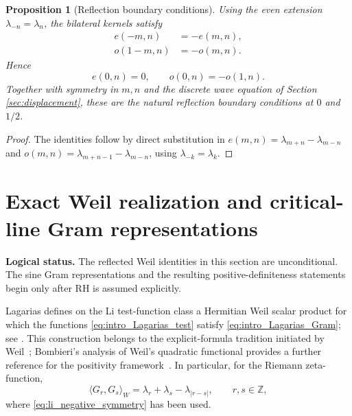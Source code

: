 \documentclass[preprint,12pt]{elsarticle}
\numberwithin{equation}{section}
\theoremstyle{plain}
\newtheorem{proposition}[theorem]{Proposition}
\theoremstyle{definition}
\theoremstyle{remark}
\newcommand{\RH}{\mathrm{RH}}
\begin{document}
\begin{proposition}[Reflection boundary conditions]
\label{prop:reflection_boundary_conditions}
Using the even extension $\lambda_{-n}=\lambda_n$, the bilateral kernels satisfy
\begin{align}
e(-m,n)&=-e(m,n),
\label{eq:E_reflection_oddness}\\
o(1-m,n)&=-o(m,n).
\label{eq:O_reflection_oddness}
\end{align}
Hence
\begin{equation}
e(0,n)=0,
\qquad
o(0,n)=-o(1,n).
\label{eq:reflection_boundary_values}
\end{equation}
Together with symmetry in $m,n$ and the discrete wave equation of Section \ref{sec:displacement}, these are the natural reflection boundary conditions at $0$ and $1/2$.
\end{proposition}

\begin{proof}
The identities follow by direct substitution in
$e(m,n)=\lambda_{m+n}-\lambda_{m-n}$ and
$o(m,n)=\lambda_{m+n-1}-\lambda_{m-n}$, using $\lambda_{-k}=\lambda_k$.
\end{proof}

\section{Exact Weil realization and critical-line Gram representations}
\label{sec:gram_criterion}

\noindent\textbf{Logical status.}\quad
The reflected Weil identities in this section are unconditional.  The sine Gram
representations and the resulting positive-definiteness statements begin only after \(\RH\) is
assumed explicitly.

Lagarias defines on the Li test-function class a Hermitian Weil scalar product for which the functions
\eqref{eq:intro_Lagarias_test} satisfy \eqref{eq:intro_Lagarias_Gram}; see
\cite[Section~3, Theorem~3.1]{Lagarias2007}.  This construction belongs to the explicit-formula
tradition initiated by Weil~\cite{Weil1952}; Bombieri's analysis of Weil's quadratic functional
provides a further reference for the positivity framework~\cite{Bombieri2000}.  In particular, for
the Riemann zeta-function,
\begin{equation}
\langle G_r,G_s\rangle_W
=\lambda_r+\lambda_s-\lambda_{|r-s|},
\qquad r,s\in\mathbb Z,
\label{eq:Lagarias_kernel_zeta}
\end{equation}
where \eqref{eq:li_negative_symmetry} has been used.
\end{document}
